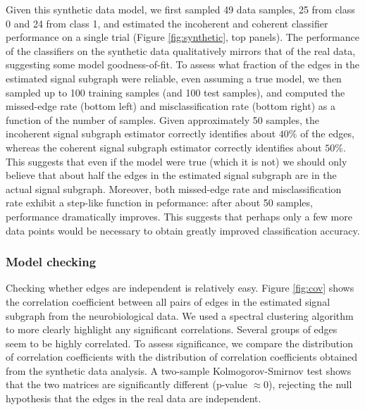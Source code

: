 \documentclass[10pt,journal,cspaper,compsoc]{IEEEtran}
\begin{document}
Given this synthetic data model, we first sampled 49 data samples, 25 from class 0 and 24 from class 1, and estimated the incoherent and coherent classifier performance on a single trial (Figure \ref{fig:synthetic}, top panels).  The performance of the classifiers on the synthetic data qualitatively mirrors that of the real data, suggesting some model goodness-of-fit.  To assess what fraction of the edges in the estimated signal subgraph were reliable, even assuming a true model, we then sampled up to 100 training samples (and 100 test samples), and computed the missed-edge rate (bottom left) and misclassification rate (bottom right) as a function of the number of samples.  Given approximately 50 samples, the incoherent signal subgraph estimator correctly identifies about $40\%$ of the edges, whereas the coherent signal subgraph estimator correctly identifies about $50\%$.  This suggests that even if the model were true (which it is not) we should only believe that about half the edges in the estimated signal subgraph are in the actual signal subgraph.  Moreover, both missed-edge rate and misclassification rate exhibit a step-like function in peformance: after about 50 samples, performance dramatically improves.  This suggests that perhaps only a few more data points would be necessary to obtain greatly improved classification accuracy.  


\subsubsection{Model checking} %
\label{ssub:model_checking}


Checking whether edges are independent is relatively easy.  Figure \ref{fig:cov} shows the correlation coefficient between all pairs of edges in the estimated signal subgraph from the neurobiological data.  We used a spectral clustering algorithm \cite{Dhillon2001} to  more clearly highlight any significant correlations.  Several groups of edges seem to be highly  correlated.  To assess significance, we compare the distribution of correlation coefficients with the distribution of correlation coefficients obtained from the synthetic data analysis.  A two-sample Kolmogorov-Smirnov test shows that the two matrices are significantly different (p-value $\approx 0$), rejecting the null hypothesis that the edges in the real data are independent. 
\end{document}
